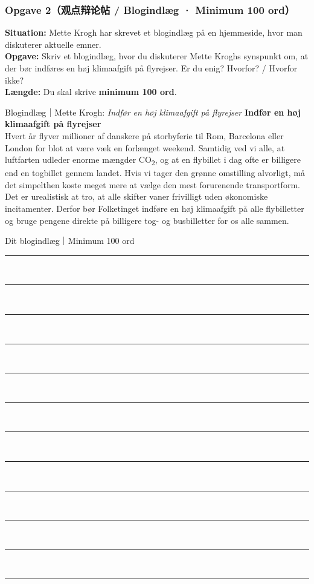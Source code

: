 \subsubsection*{Opgave 2（观点辩论帖 / Blogindlæg · Minimum 100 ord）}

\textbf{Situation:} Mette Krogh har skrevet et blogindlæg på en hjemmeside, hvor man diskuterer aktuelle emner.\\
\textbf{Opgave:} Skriv et blogindlæg, hvor du diskuterer Mette Kroghs synspunkt om, at der bør indføres en høj klimaafgift på flyrejser. Er du enig? Hvorfor? / Hvorfor ikke?\\
\textbf{Længde:} Du skal skrive \textbf{minimum 100 ord}.

\begin{emailbox}{Blogindlæg｜Mette Krogh: \textit{Indfør en høj klimaafgift på flyrejser}}
\textbf{Indfør en høj klimaafgift på flyrejser}\\[3pt]
Hvert år flyver millioner af danskere på storbyferie til Rom, Barcelona eller London for blot at være væk en forlænget weekend. Samtidig ved vi alle, at luftfarten udleder enorme mængder CO\textsubscript{2}, og at en flybillet i dag ofte er billigere end en togbillet gennem landet. Hvis vi tager den grønne omstilling alvorligt, må det simpelthen koste meget mere at vælge den mest forurenende transportform. Det er urealistisk at tro, at alle skifter vaner frivilligt uden økonomiske incitamenter. Derfor bør Folketinget indføre en høj klimaafgift på alle flybilletter og bruge pengene direkte på billigere tog- og busbilletter for os alle sammen.
\end{emailbox}

\begin{emailbox}{Dit blogindlæg｜Minimum 100 ord}
\vspace{0.25em}
\rule{\linewidth}{0.4pt}\\[0.55em]
\rule{\linewidth}{0.4pt}\\[0.55em]
\rule{\linewidth}{0.4pt}\\[0.55em]
\rule{\linewidth}{0.4pt}\\[0.55em]
\rule{\linewidth}{0.4pt}\\[0.55em]
\rule{\linewidth}{0.4pt}\\[0.55em]
\rule{\linewidth}{0.4pt}\\[0.55em]
\rule{\linewidth}{0.4pt}\\[0.55em]
\rule{\linewidth}{0.4pt}\\[0.55em]
\rule{\linewidth}{0.4pt}\\[0.55em]
\rule{\linewidth}{0.4pt}\\[0.55em]
\rule{\linewidth}{0.4pt}
\end{emailbox}

